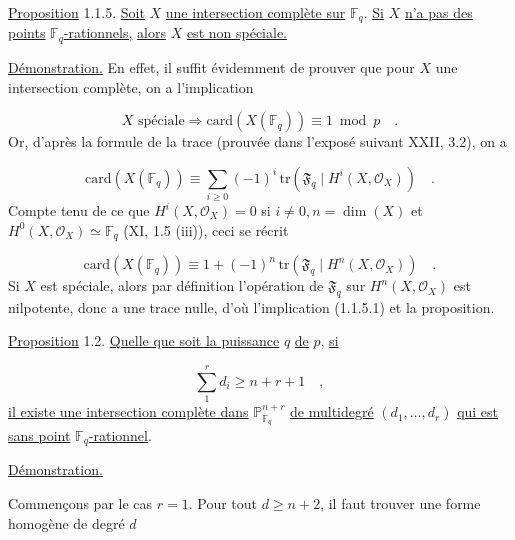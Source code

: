 \underline{Proposition} 1.1.5. \underline{Soit} $X$ \underline{une intersection complète sur} $\mathbb{F}_q$. \underline{Si} $X$ \underline{n'a pas des points} $\mathbb{F}_q$\underline{-rationnels,} \underline{alors} $X$ \underline{est non spéciale.}



\underline{Démonstration.} En effet, il suffit évidemment de prouver que pour $X$ une intersection complète, on a l'implication

\begin{equation}\tag{1.1.5.1}
X \text{ spéciale} \Longrightarrow \mathrm{card}(X(\mathbb{F}_q)) \equiv 1 \bmod p \quad .
\end{equation}
Or, d'après la formule de la trace (prouvée dans l'exposé suivant XXII, 3.2), on a

\begin{equation*}
\mathrm{card}(X(\mathbb{F}_q)) \equiv \sum_{i \geq 0} (-1)^i \, \mathrm{tr}(\mathfrak{F}_q \mid H^i(X,\mathcal{O}_X)) \quad .
\end{equation*}
Compte tenu de ce que $H^i(X,\mathcal{O}_X)=0$ si $i \neq 0, n=\dim(X)$ et $H^0(X,\mathcal{O}_X) \simeq \mathbb{F}_q$ (XI, 1.5 (iii)), ceci se récrit

\begin{equation*}
\mathrm{card}(X(\mathbb{F}_q)) \equiv 1 + (-1)^n \, \mathrm{tr}(\mathfrak{F}_q \mid H^n(X,\mathcal{O}_X)) \quad .
\end{equation*}
Si $X$ est spéciale, alors par définition l'opération de $\mathfrak{F}_q$ sur $H^n(X,\mathcal{O}_X)$ est nilpotente, donc a une trace nulle, d'où l'implication (1.1.5.1) et la proposition.

\underline{Proposition} 1.2. \underline{Quelle que soit la puissance} $q$ \underline{de} $p$, \underline{si}

\begin{equation*}
\sum_1^r d_i \geq n+r+1 \quad ,
\end{equation*}
\underline{il existe une intersection complète dans} $\mathbb{P}^{n+r}_{\mathbb{F}_q}$ \underline{de multidegré} $(d_1,\dots,d_r)$ \underline{qui est sans point} $\mathbb{F}_q$\underline{-rationnel}.

\underline{Démonstration.}

Commençons par le cas $r=1$. Pour tout $d \geq n+2$, il faut trouver une forme homogène de degré $d$ 



